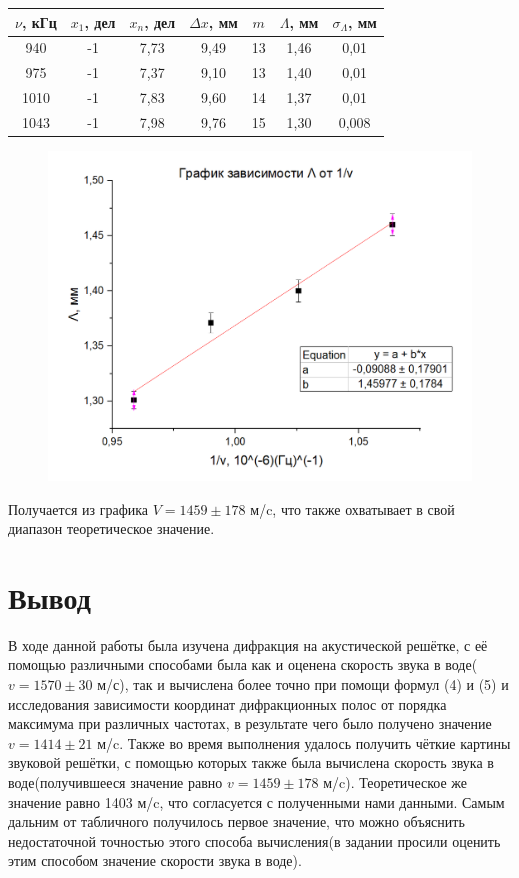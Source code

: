 \documentclass[a4paper,12pt]{article}
\begin{document}
\begin{table}[H]
	\centering
	\begin{tabular}{|c|c|c|c|c|c|c|}
	\hline
	$\nu$, кГц & $x_1$, дел & $x_n$, дел & $\Delta x$, мм & $m$ & $\Lambda$, мм & $\sigma_{\Lambda}$, мм  \\ \hline
	940 & -1 & 7,73 & 9,49 & 13 & 1,46 & 0,01 \\ \hline
	975 & -1 & 7,37 & 9,10 & 13 & 1,40 & 0,01 \\ \hline
	1010 & -1 & 7,83 & 9,60 & 14 & 1,37 & 0,01 \\ \hline
	1043 & -1 & 7,98 & 9,76 & 15 & 1,30& 0,008 \\ \hline	
	\end{tabular}
\end{table}

\begin{figure}[H]
	\centering
	\includegraphics[scale=0.8]{graph7.png}
\end{figure}

Получается из графика $V = 1459 \pm 178$ м/c, что также охватывает в свой диапазон теоретическое значение.

\section{Вывод}
В ходе данной работы была изучена дифракция на акустической решётке, с её помощью различными способами была как и оценена скорость звука в воде($v = 1570 \pm 30$ м/с), так и вычислена более точно при помощи формул (4) и (5) и исследования зависимости координат дифракционных полос от порядка максимума при различных частотах, в результате чего было получено значение $v = 1414 \pm 21$ м/c. Также во время выполнения удалось получить чёткие картины звуковой решётки, с помощью которых также была вычислена скорость звука в воде(получившееся значение равно $v = 1459 \pm 178$ м/c). Теоретическое же значение равно 1403 м/c, что согласуется с полученными нами данными. Самым дальним от табличного получилось первое значение, что можно объяснить недостаточной точностью этого способа вычисления(в задании просили оценить этим способом значение скорости звука в воде).  
\end{document}
